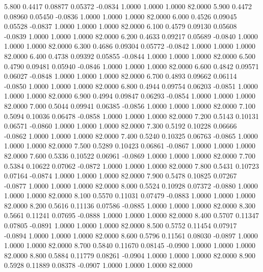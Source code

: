    5.800   0.4417   0.08877   0.05372  -0.0834   1.0000   1.0000   1.0000  82.0000
   5.900   0.4472   0.08960   0.05450  -0.0836   1.0000   1.0000   1.0000  82.0000
   6.000   0.4526   0.09045   0.05528  -0.0837   1.0000   1.0000   1.0000  82.0000
   6.100   0.4579   0.09130   0.05608  -0.0839   1.0000   1.0000   1.0000  82.0000
   6.200   0.4633   0.09217   0.05689  -0.0840   1.0000   1.0000   1.0000  82.0000
   6.300   0.4686   0.09304   0.05772  -0.0842   1.0000   1.0000   1.0000  82.0000
   6.400   0.4738   0.09392   0.05855  -0.0844   1.0000   1.0000   1.0000  82.0000
   6.500   0.4790   0.09481   0.05940  -0.0846   1.0000   1.0000   1.0000  82.0000
   6.600   0.4842   0.09571   0.06027  -0.0848   1.0000   1.0000   1.0000  82.0000
   6.700   0.4893   0.09662   0.06114  -0.0850   1.0000   1.0000   1.0000  82.0000
   6.800   0.4944   0.09754   0.06203  -0.0851   1.0000   1.0000   1.0000  82.0000
   6.900   0.4994   0.09847   0.06293  -0.0854   1.0000   1.0000   1.0000  82.0000
   7.000   0.5044   0.09941   0.06385  -0.0856   1.0000   1.0000   1.0000  82.0000
   7.100   0.5094   0.10036   0.06478  -0.0858   1.0000   1.0000   1.0000  82.0000
   7.200   0.5143   0.10131   0.06571  -0.0860   1.0000   1.0000   1.0000  82.0000
   7.300   0.5192   0.10228   0.06666  -0.0862   1.0000   1.0000   1.0000  82.0000
   7.400   0.5240   0.10325   0.06763  -0.0865   1.0000   1.0000   1.0000  82.0000
   7.500   0.5289   0.10423   0.06861  -0.0867   1.0000   1.0000   1.0000  82.0000
   7.600   0.5336   0.10522   0.06961  -0.0869   1.0000   1.0000   1.0000  82.0000
   7.700   0.5384   0.10622   0.07062  -0.0872   1.0000   1.0000   1.0000  82.0000
   7.800   0.5431   0.10723   0.07164  -0.0874   1.0000   1.0000   1.0000  82.0000
   7.900   0.5478   0.10825   0.07267  -0.0877   1.0000   1.0000   1.0000  82.0000
   8.000   0.5524   0.10928   0.07372  -0.0880   1.0000   1.0000   1.0000  82.0000
   8.100   0.5570   0.11031   0.07479  -0.0883   1.0000   1.0000   1.0000  82.0000
   8.200   0.5616   0.11136   0.07586  -0.0885   1.0000   1.0000   1.0000  82.0000
   8.300   0.5661   0.11241   0.07695  -0.0888   1.0000   1.0000   1.0000  82.0000
   8.400   0.5707   0.11347   0.07805  -0.0891   1.0000   1.0000   1.0000  82.0000
   8.500   0.5752   0.11454   0.07917  -0.0894   1.0000   1.0000   1.0000  82.0000
   8.600   0.5796   0.11561   0.08030  -0.0897   1.0000   1.0000   1.0000  82.0000
   8.700   0.5840   0.11670   0.08145  -0.0900   1.0000   1.0000   1.0000  82.0000
   8.800   0.5884   0.11779   0.08261  -0.0904   1.0000   1.0000   1.0000  82.0000
   8.900   0.5928   0.11889   0.08378  -0.0907   1.0000   1.0000   1.0000  82.0000
